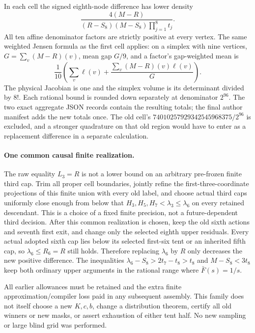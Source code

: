 In each cell the signed eighth-node difference has lower density
\[
 \frac{4(M-R)}{(R-S_8)(M-S_8)\prod_{j=1}^{8}t_j}.
\]
All ten affine denominator factors are strictly positive at every vertex.
The same weighted Jensen formula as the first cell applies: on a simplex
with nine vertices, $G=\sum_v(M-R)(v)$, mean gap $G/9$, and a factor's
gap-weighted mean is
\[
 \frac1{10}\left(\sum_v\ell(v)+
 \frac{\sum_v(M-R)(v)\ell(v)}G\right).
\]
The physical Jacobian is one and the simplex volume is its determinant
divided by $8!$. Each rational bound is rounded down separately at
denominator $2^{96}$. The two exact aggregate JSON records contain the
resulting totals; the final author manifest adds the new totals once.
The old cell's $74010257929342545968375/2^{96}$ is excluded, and a stronger
quadrature on that old region would have to enter as a replacement
difference in a separate calculation.

\paragraph{One common causal finite realization.}
The raw equality $L_3=R$ is not a lower bound on an arbitrary pre-frozen
finite third cap. Trim all proper cell boundaries, jointly refine the
first-three-coordinate projections of this finite union with every old
label, and choose actual third caps uniformly close enough from below
that $H_3,H_5,H_7<\lambda_3\le\lambda_6$ on every retained descendant.
This is a choice of a fixed finite precision, not a future-dependent
third decision. After this common realization is chosen, keep the old
sixth actions and seventh first exit, and change only the selected
eighth upper residuals. Every actual adopted sixth cap lies below its
selected first-six tent or an inherited fifth cap, so
$\lambda_6\le R_6=R$ still holds. Therefore replacing $\lambda_6$ by $R$
only decreases the new positive difference. The inequalities
$\lambda_6-S_8>2t_7-t_8>t_8$ and $M-S_8<3t_8$ keep both ordinary upper
arguments in the rational range where $\bar F(s)=1/s$.

All earlier allowances must be retained and the extra finite
approximation/compiler loss paid in any subsequent assembly. This family
does not itself choose a new $K,c,b$, change a distribution theorem,
certify all old winners or new masks, or assert exhaustion of either
tent half. No new sampling or large blind grid was performed.
